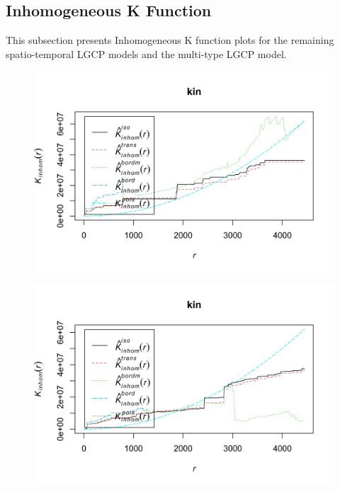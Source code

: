 \begin{appendices}
\section{Inhomogeneous K Function} \label{app:inhomogeneous-k-function}

    This subsection presents Inhomogeneous K function plots for the remaining spatio-temporal LGCP models and the multi-type LGCP model.

    \begin{figure}[H]
        \begin{center}
            \includegraphics[width=\linewidth]{Inhomogeneous K Function - Major 2.png}
        \end{center}
    \end{figure}

    \begin{figure}[H]
        \begin{center}
            \includegraphics[width=\linewidth]{Inhomogeneous K Function - Major 13456.png}
        \end{center}
    \end{figure}


\end{appendices}
